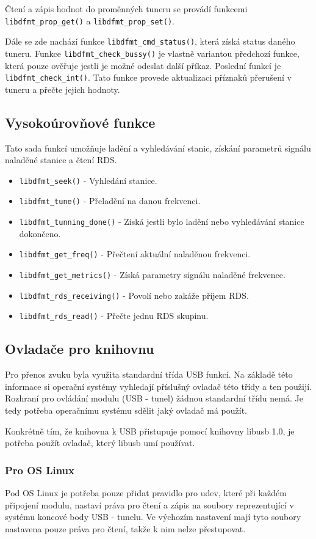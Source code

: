 Čtení a zápis hodnot do proměnných tuneru se provádí funkcemi \verb|libdfmt_prop_get()| a \verb|libdfmt_prop_set()|.

Dále se zde nachází funkce \verb|libdfmt_cmd_status()|, která získá status daného tuneru. Funkce \verb|libdfmt_check_bussy()| je vlastně variantou předchozí funkce, která pouze ověřuje jestli je možné odeslat další příkaz. Poslední funkcí je \verb|libdfmt_check_int()|. Tato funkce provede aktualizaci příznaků přerušení v tuneru a přečte jejich hodnoty.

\subsection{Vysokoúrovňové funkce}
Tato sada funkcí umožňuje ladění a vyhledávání stanic, získání parametrů signálu naladěné stanice a čtení RDS.

\begin{itemize}
\item \verb|libdfmt_seek()| - Vyhledání stanice.
\item \verb|libdfmt_tune()| - Přeladění na danou frekvenci. 
\item \verb|libdfmt_tunning_done()| - Získá jestli bylo ladění nebo vyhledávání stanice dokončeno.
\item \verb|libdfmt_get_freq()| - Přečtení aktuální naladěnou frekvenci.
\item \verb|libdfmt_get_metrics()| - Získá parametry signálu naladěné frekvence.
\item \verb|libdfmt_rds_receiving()| - Povolí nebo zakáže příjem RDS.
\item \verb|libdfmt_rds_read()| - Přečte jednu RDS skupinu.
\end{itemize}

\subsection{Ovladače pro knihovnu}
Pro přenos zvuku byla využita standardní třída USB funkcí. Na základě této informace si operační systémy vyhledají příslušný ovladač této třídy a ten použijí. Rozhraní pro ovládání modulu (USB - \iic tunel) žádnou standardní třídu nemá. Je tedy potřeba operačnímu systému sdělit jaký ovladač má použít.

Konkrétně tím, že knihovna k USB přistupuje pomocí knihovny libusb 1.0, je potřeba použít ovladač, který libusb umí používat.

\subsubsection{Pro OS Linux}
Pod OS Linux je potřeba pouze přidat pravidlo pro udev, které při každém připojení modulu, nastaví práva pro čtení a zápis na soubory reprezentující v systému koncové body USB - \iic tunelu. Ve výchozím nastavení mají tyto soubory nastavena pouze práva pro čtení, takže k nim nelze přestupovat.

